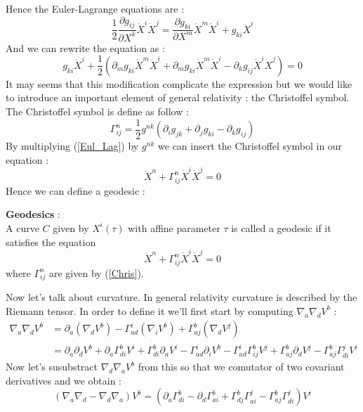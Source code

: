 \documentclass[a4paper,12pt]{article}
\theoremstyle{definition}
\begin{document}
Hence the Euler-Lagrange equations are :
\begin{equation}
	\frac{1}{2}\frac{\partial g_{ij}}{\partial X^k}\dot{X}^i\dot{X}^j=
	\frac{\partial g_{ki}}{\partial X^m}\dot{X}^m\dot{X}^i+g_{ki}\ddot{X}^i
\end{equation}
And we can rewrite the equation as :
\begin{equation}\label{Eul_Lag}
	g_{ki}\ddot{X}^i+\frac{1}{2}(\partial_m g_{ki}\dot{X}^m\dot{X}^i+\partial_m g_{ki}\dot{X}^m\dot{X}^i-\partial_k g_{ij}\dot{X}^i\dot{X}^j)=0
\end{equation}
It may seems that this modification complicate the expression but we would like to introduce an important element of general relativity : the Christoffel symbol.
The Christoffel symbol is define as follow :
\begin{equation}\label{Chris}
	\Gamma^n_{ij}=\frac{1}{2}g^{nk}(\partial_i g_{jk}+\partial_j g_{ki}-\partial_k g_{ij})
\end{equation}
By multiplying (\ref{Eul_Lag}) by $g^{nk}$ we can insert the Christoffel symbol in our equation :
\begin{equation}
	\ddot{X}^n+\Gamma^n_{ij}\dot{X}^i\dot{X}^j=0
\end{equation}
Hence we can define a geodesic :
\begin{definition}
	\textbf{Geodesics} :\\
	A curve $C$ given by $X^i(\tau)$ with affine parameter $\tau$ is called a geodesic if it satisfies the equation
	\begin{equation}
		\ddot{X}^n+\Gamma^n_{ij}\dot{X}^i\dot{X}^j=0
	\end{equation}
	where $\Gamma^n_{ij}$ are given by (\ref{Chris}).
\end{definition}
Now let's talk about curvature. In general relativity curvature is described by the Riemann tensor.
In order to define it we'll first start by computing $\nabla _a \nabla _d V^b$ :
\begin{align}
	\nabla _a \nabla _d V^b &= \partial_a(\nabla _d V^b)-\Gamma^i_{ad} (\nabla _i V^b)+\Gamma^b_{aj} (\nabla _d V^j)\\
	&=\partial_a\partial_d V^b+ \partial_a \Gamma^b_{di}V^i+ \Gamma^b_{di}\partial_a V^i - \Gamma^i_{ad}\partial_i V^b
	-\Gamma^i_{ad}\Gamma^b_{ij}V^j+\Gamma^b_{aj}\partial_d V^j-\Gamma^b_{aj}\Gamma^j_{di}V^i
\end{align}
Now let's susubstract $\nabla _d \nabla _a V^b$ from this so that we comutator of two covariant derivatives and we obtain :
\begin{equation}
	(\nabla _a \nabla _d - \nabla _d \nabla _a)V^b=(\partial_a \Gamma^b_{di}-\partial_d \Gamma^b_{ai}+\Gamma^b_{dj}\Gamma^j_{ai}-\Gamma^b_{aj}\Gamma^j_{di})V^i
\end{equation}
\end{document}

